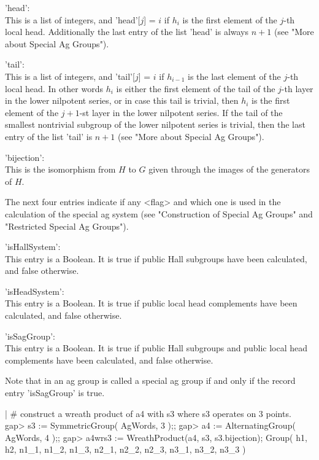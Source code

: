 'head':  \\
    This is a list of integers, and 'head'[$j$] =  $i$ if $h_i$  is the
    first element of the $j$-th  local head.  Additionally the  last  
    entry of the list 'head' is always $n + 1$ (see "More about Special 
    Ag Groups").

'tail':  \\
    This is a list of integers, and 'tail'[$j$] =  $i$ if $h_{i-1}$ is 
    the last element of the $j$-th local head. In other words $h_i$ is either 
    the first element of the tail of the $j$-th layer in the lower nilpotent
    series, or in case this tail is trivial, then $h_i$ is the first 
    element of the $j+1$-st layer in the lower nilpotent series. 
    If the tail of the smallest nontrivial subgroup of the lower nilpotent
    series is trivial, then the last entry of the list 'tail' is $n+1$
    (see "More about Special Ag Groups").

'bijection':  \\ 
    This is the  isomorphism from $H$ to $G$ given through the  images of
    the generators of $H$.

The next four entries indicate if any <flag> and which one is used 
in the calculation of the special ag system (see "Construction of 
Special Ag Groups" and "Restricted Special Ag Groups").

'isHallSystem': \\  
    This entry is a Boolean. It is true if public Hall subgroups have
    been calculated, and false otherwise.

'isHeadSystem': \\ 
    This entry is a Boolean. It is true if public local head complements
    have been calculated, and false otherwise.

'isSagGroup': \\ 
    This entry is a Boolean. It is true if public Hall subgroups and
    public local head complements have been calculated, and false otherwise.

Note that in {\GAP} an ag group is called a special ag group if and only
if the record entry 'isSagGroup' is true.

\vspace{.5cm}
|    # construct a wreath product of a4 with s3 where s3 operates on 3 points.
    gap> s3 := SymmetricGroup( AgWords, 3 );;
    gap> a4 := AlternatingGroup( AgWords, 4 );;
    gap> a4wrs3 := WreathProduct(a4, s3, s3.bijection);
    Group( h1, h2, n1_1, n1_2, n1_3, n2_1, n2_2, n2_3, n3_1, n3_2, n3_3 )

